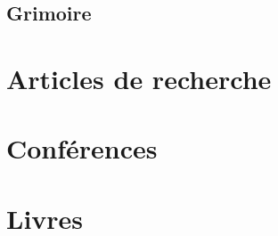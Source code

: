 \documentclass[11pt,a4paper]{article}
\begin{document}
\newpage
\begin{center}  
\section*{Grimoire} 
\end{center}







\section{Articles de recherche}

\section{Conférences}

\section{Livres}
\end{document}

